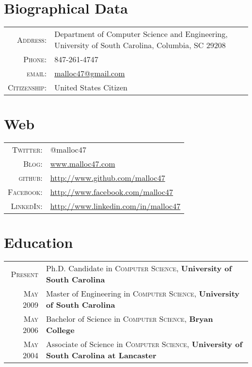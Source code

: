 \documentclass[a4paper,10pt]{article}
\begin{document}
\pagestyle{empty}
\par{\bigskip\par}

\section{Biographical Data}

\begin{tabular}{r p{12cm}}
  \textsc{Address:}	& Department of Computer Science and Engineering, University of South Carolina, Columbia, SC 29208 \\
  \textsc{Phone:}       & 847-261-4747\\
  \textsc{email:}       & \href{mailto:malloc47@gmail.com}{malloc47@gmail.com} \\
  \textsc{Citizenship:} & United States Citizen \\
\end{tabular}

\section{Web}
\begin{tabular}{r p{12cm}}
  \textsc{Twitter:}     & @malloc47 \\
  \textsc{Blog:}	& \href{http://www.malloc47.com}{www.malloc47.com} \\
  \textsc{github:}      & \href{http://www.github.com/malloc47}{http://www.github.com/malloc47}\\
  \textsc{Facebook:}    & \href{http://www.facebook.com/malloc47}{http://www.facebook.com/malloc47} \\
  \textsc{LinkedIn:}       & \href{http://www.linkedin.com/in/malloc47}{http://www.linkedin.com/in/malloc47} \\
\end{tabular}

\section{Education}
\begin{tabular}{r p{13.5cm}}	
  \textsc{Present} & Ph.D. Candidate in \textsc{Computer Science}, \textbf{University of South Carolina}\\
  \textsc{May} 2009 & Master of Engineering in \textsc{Computer Science}, \textbf{University of South Carolina}\\
  \textsc{May} 2006& Bachelor of Science in \textsc{Computer Science}, \textbf{Bryan College} \\
\textsc{May} 2004& Associate of Science in \textsc{Computer Science}, \textbf{University of South Carolina at Lancaster} \\
\end{tabular}
\end{document}
